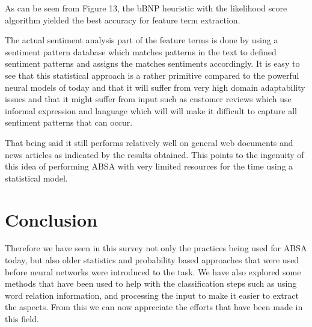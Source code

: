 \documentclass[conference]{IEEEtran}
\begin{document}
As can be seen from Figure 13, the bBNP heuristic with the likelihood score algorithm yielded the best accuracy for feature term extraction.

The actual sentiment analysis part of the feature terms is done by using a sentiment pattern database which matches patterns in the text to defined sentiment patterns and assigns the matches sentiments accordingly. It is easy to see that this statistical approach is a rather primitive compared to the powerful neural models of today and that it will suffer from very high domain adaptability issues and that it might suffer from input such as customer reviews which use informal expression and language which will will make it difficult to capture all sentiment patterns that can occur.

That being said it still performs relatively well on general web documents and news articles as indicated by the results obtained. This points to the ingenuity of this idea of performing ABSA with very limited resources for the time using a statistical model.

\section{Conclusion}

Therefore we have seen in this survey not only the practices being used for ABSA today, but also older statistics and probability based approaches that were used before neural networks were introduced to the task. We have also explored some methods that have been used to help with the classification steps such as using word relation information, and processing the input to make it easier to extract the aspects. From this we can now appreciate the efforts that have been made in this field.
\end{document}

